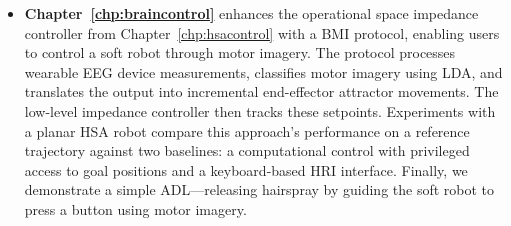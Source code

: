 \begin{itemize}
    \item \textbf{Chapter~\ref{chp:braincontrol}} enhances the operational space impedance controller from Chapter~\ref{chp:hsacontrol} with a \gls{BMI} protocol, enabling users to control a soft robot through motor imagery. The protocol processes wearable \gls{EEG} device measurements, classifies motor imagery using \gls{LDA}, and translates the output into incremental end-effector attractor movements. The low-level impedance controller then tracks these setpoints. Experiments with a planar \gls{HSA} robot compare this approach's performance on a reference trajectory against two baselines: a computational control with privileged access to goal positions and a keyboard-based \gls{HRI} interface. Finally, we demonstrate a simple \gls{ADL}—releasing hairspray by guiding the soft robot to press a button using motor imagery.  

\end{itemize}
